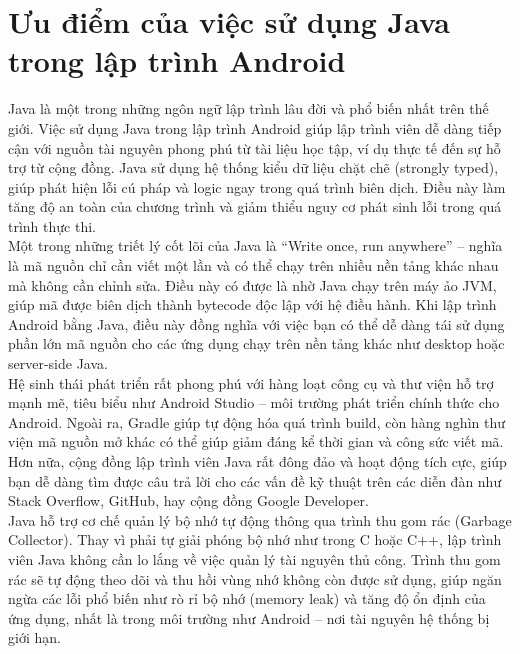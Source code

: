 \section{ Ưu điểm của việc sử dụng Java trong lập trình Android}
    \begin{flushleft}
        \hspace*{0.8cm}Java là một trong những ngôn ngữ lập trình lâu đời và phổ biến nhất trên thế giới. Việc sử dụng Java trong lập trình Android giúp lập trình viên dễ dàng tiếp cận với nguồn tài nguyên phong phú từ tài liệu học tập, ví dụ thực tế đến sự hỗ trợ từ cộng đồng. Java sử dụng hệ thống kiểu dữ liệu chặt chẽ (strongly typed), giúp phát hiện lỗi cú pháp và logic ngay trong quá trình biên dịch. Điều này làm tăng độ an toàn của chương trình và giảm thiểu nguy cơ phát sinh lỗi trong quá trình thực thi.\\
        \hspace*{0.8cm}Một trong những triết lý cốt lõi của Java là “Write once, run anywhere” – nghĩa là mã nguồn chỉ cần viết một lần và có thể chạy trên nhiều nền tảng khác nhau mà không cần chỉnh sửa. Điều này có được là nhờ Java chạy trên máy ảo JVM, giúp mã được biên dịch thành bytecode độc lập với hệ điều hành. Khi lập trình Android bằng Java, điều này đồng nghĩa với việc bạn có thể dễ dàng tái sử dụng phần lớn mã nguồn cho các ứng dụng chạy trên nền tảng khác như desktop hoặc server-side Java.\\
        \hspace*{0.8cm}Hệ sinh thái phát triển rất phong phú với hàng loạt công cụ và thư viện hỗ trợ mạnh mẽ, tiêu biểu như Android Studio – môi trường phát triển chính thức cho Android. Ngoài ra, Gradle giúp tự động hóa quá trình build, còn hàng nghìn thư viện mã nguồn mở khác có thể giúp giảm đáng kể thời gian và công sức viết mã. Hơn nữa, cộng đồng lập trình viên Java rất đông đảo và hoạt động tích cực, giúp bạn dễ dàng tìm được câu trả lời cho các vấn đề kỹ thuật trên các diễn đàn như Stack Overflow, GitHub, hay cộng đồng Google Developer.\\
        \hspace*{0.8cm}Java hỗ trợ cơ chế quản lý bộ nhớ tự động thông qua trình thu gom rác (Garbage Collector). Thay vì phải tự giải phóng bộ nhớ như trong C hoặc C++, lập trình viên Java không cần lo lắng về việc quản lý tài nguyên thủ công. Trình thu gom rác sẽ tự động theo dõi và thu hồi vùng nhớ không còn được sử dụng, giúp ngăn ngừa các lỗi phổ biến như rò rỉ bộ nhớ (memory leak) và tăng độ ổn định của ứng dụng, nhất là trong môi trường như Android – nơi tài nguyên hệ thống bị giới hạn.\\
    

\end{flushleft}
